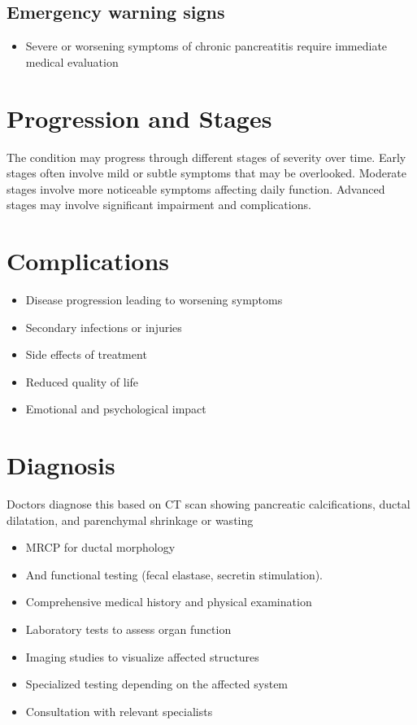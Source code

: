 \subsection{Emergency warning signs}
\begin{itemize}[noitemsep]
  \item Severe or worsening symptoms of chronic pancreatitis require immediate medical evaluation
\end{itemize}
\section{Progression and Stages}
The condition may progress through different stages of severity over time. Early stages often involve mild or subtle symptoms that may be overlooked. Moderate stages involve more noticeable symptoms affecting daily function. Advanced stages may involve significant impairment and complications.
\section{Complications}
\begin{itemize}[noitemsep]
  \item Disease progression leading to worsening symptoms
  \item Secondary infections or injuries
  \item Side effects of treatment
  \item Reduced quality of life
  \item Emotional and psychological impact
\end{itemize}
\section{Diagnosis}
Doctors diagnose this based on CT scan showing pancreatic calcifications, ductal dilatation, and parenchymal shrinkage or wasting

\begin{itemize}[noitemsep]
  \item MRCP for ductal morphology
  \item And functional testing (fecal elastase, secretin stimulation).
  \item Comprehensive medical history and physical examination
  \item Laboratory tests to assess organ function
  \item Imaging studies to visualize affected structures
  \item Specialized testing depending on the affected system
  \item Consultation with relevant specialists
\end{itemize}
